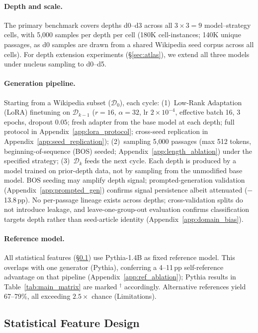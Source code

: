 \paragraph{Depth and scale.}
The primary benchmark covers depths d0--d3 across all $3 \times 3 = 9$ model--strategy cells, with 5{,}000 samples per depth per cell (180K cell-instances; 140K unique passages, as d0 samples are drawn from a shared Wikipedia seed corpus across all cells).
For depth extension experiments (\S\ref{sec:atlas}), we extend all three models under nucleus sampling to d0--d5.

\paragraph{Generation pipeline.}
Starting from a Wikipedia subset ($\mathcal{D}_0$), each cycle: (1)~Low-Rank Adaptation (LoRA) finetuning \cite{hu2022lora} on $\mathcal{D}_{k-1}$ ($r{=}16$, $\alpha{=}32$, lr $2{\times}10^{-4}$, effective batch 16, 3 epochs, dropout $0.05$; fresh adapter from the base model at each depth; full protocol in Appendix~\ref{app:lora_protocol}; cross-seed replication in Appendix~\ref{app:seed_replication}); (2)~sampling 5{,}000 passages (max 512 tokens, beginning-of-sequence (BOS) seeded; Appendix~\ref{app:length_ablation}) under the specified strategy; (3)~$\mathcal{D}_k$ feeds the next cycle.
Each depth is produced by a model trained on prior-depth data, not by sampling from the unmodified base model.
BOS seeding may amplify depth signal; prompted-generation validation (Appendix~\ref{app:prompted_gen}) confirms signal persistence albeit attenuated ($-$13.8\,pp).
No per-passage lineage exists across depths; cross-validation splits do not introduce leakage, and leave-one-group-out evaluation confirms classification targets depth rather than seed-article identity (Appendix~\ref{app:domain_bias}).

\paragraph{Reference model.}
All statistical features (\S\ref{sec:method:features}) use Pythia-1.4B as fixed reference model.
This overlaps with one generator (Pythia), conferring a 4--11\,pp self-reference advantage on that pipeline (Appendix~\ref{app:ref_ablation}); Pythia results in Table~\ref{tab:main_matrix} are marked $^\dagger$ accordingly.
Alternative references yield 67--79\%, all exceeding $2.5{\times}$ chance (Limitations).

\subsection{Statistical Feature Design}
\label{sec:method:features}

